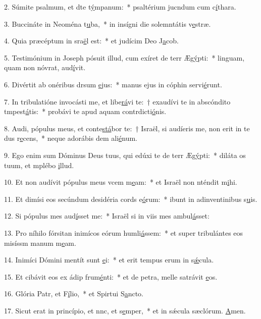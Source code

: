 2. Súmite psalmum, et dte t\uline{ý}mpanum:~* psaltérium jucndum cum c\uline{í}thara.\par 
3. Buccináte in Neoména t\uline{u}ba,~* in insígni die solemntátis v\uline{e}stræ.\par 
4. Quia præcéptum in sra\uline{ë}l est:~* et judícim Deo J\uline{a}cob.\par 
5. Testimónium in Joseph pósuit illud, cum exíret de terr Æg\uline{ý}pti:~* linguam, quam non nóvrat, aud\uline{í}vit.\par 
6. Divértit ab onéribus drsum \uline{e}jus:~* manus ejus in cóphin servi\uline{é}runt.\par 
7. In tribulatióne invocásti me, et libe\uline{rá}vi te:~† exaudívi te in abscóndito tmpest\uline{á}tis:~* probávi te apud aquam contrdicti\uline{ó}nis.\par 
8. Audi, pópulus meus, et conte\uline{stá}bor te:~† Israël, si audíeris me, non erit in te dus r\uline{e}cens,~* neque adorábis dem ali\uline{é}num.\par 
9. Ego enim sum Dóminus Deus tuus, qui edúxi te de terr Æg\uline{ý}pti:~* diláta os tuum, et mplébo \uline{i}llud.\par 
10. Et non audívit pópulus meus vcem m\uline{e}am:~* et Israël non nténdit m\uline{i}hi.\par 
11. Et dimísi eos secúndum desidéria cords e\uline{ó}rum:~* ibunt in adinventinibus s\uline{u}is.\par 
12. Si pópulus mes aud\uline{í}sset me:~* Israël si in viis mes ambul\uline{á}sset:\par 
13. Pro níhilo fórsitan inimícos eórum humli\uline{á}ssem:~* et super tribulántes eos misíssm manum m\uline{e}am.\par 
14. Inimíci Dómini mentít sunt \uline{e}i:~* et erit tempus erum in s\uline{ǽ}cula.\par 
15. Et cibávit eos ex ádip frum\uline{é}nti:~* et de petra, melle satrávit \uline{e}os.\par 
16. Glória Patr, et F\uline{í}lio,~* et Spirtui S\uline{a}ncto.\par 
17. Sicut erat in princípio, et nnc, et s\uline{e}mper,~* et in sǽcula sæclórum. \uline{A}men.\par 
